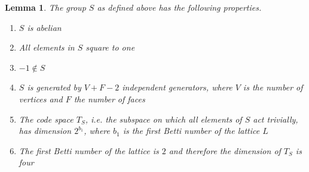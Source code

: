 \documentclass[a4paper, draft]{article}
\theoremstyle{own}
\newtheorem{lem}[thm]{Lemma}
\theoremstyle{remark}
\begin{document}
\begin{lem}
The group $S$ as defined above has the following properties.
\begin{enumerate}
	\item $S$ is abelian
	\item All elements in $S$ square to one
	\item $-1 \notin S$
	\item $S$ is generated by $V + F - 2$ independent generators, where $V$ is the number of vertices and $F$ the number of faces
	\item The code space $T_S$, i.e. the subspace on which all elements of $S$ act trivially, has dimension $2^{b_1}$, where $b_1$ is the first Betti number of the lattice $L$
	\item The first Betti number of the lattice is $2$ and therefore the dimension of $T_S$ is four
\end{enumerate}
\end{lem}
\end{document}
